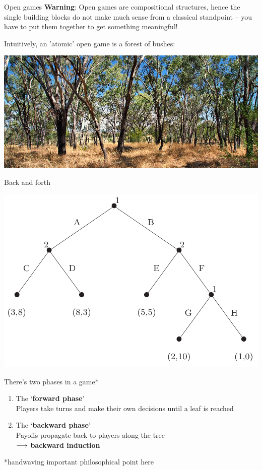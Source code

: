 \begin{frame}{Open games}
	\textbf{Warning}: Open games are compositional structures, hence the single building blocks do not make much sense from a classical standpoint -- you have to put them together to get something meaningful!

	\vfill
	Intuitively, an 'atomic' open game is a forest of bushes:

	\begin{center}
		\includegraphics[width=.9\textwidth]{figures/bush_forest.jpg}
	\end{center}
\end{frame}

\begin{frame}{Back and forth}
	\vspace{-5ex}
	\begin{center}
		\hspace{10ex}
		\includegraphics[width=.5\textwidth]{figures/ext_game.png}
	\end{center}

	\vspace{-6ex}
	There's two phases in a game*
	\begin{enumerate}
		\item The `\textbf{forward phase}'\\
		Players take turns and make their own decisions until a leaf is reached
		\item The `\textbf{backward phase}'\\
		Payoffs propagate back to players along the tree\\
		\qquad $\longrightarrow$ \textbf{backward induction}
	\end{enumerate}

	\vfill
	{\color{colornote}*handwaving important philosophical point here}
\end{frame}

